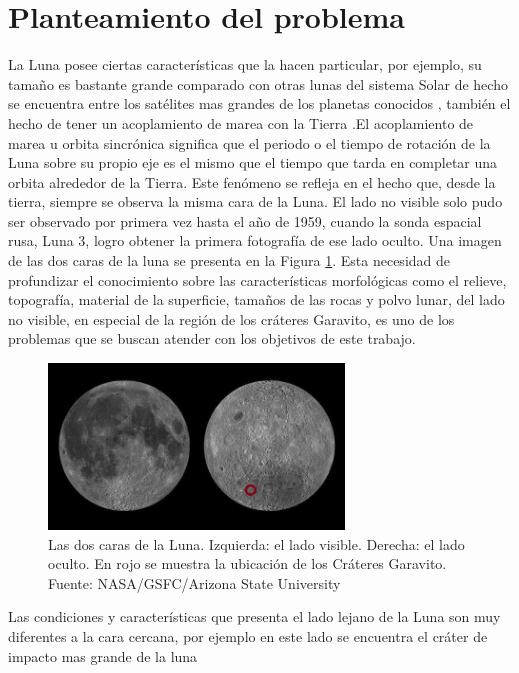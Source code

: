 \documentclass[12pt]{article}
\begin{document}
\newpage
\section{Planteamiento del problema}\label{sec:planteamiento}
La Luna posee ciertas características que la hacen particular, por ejemplo, su tamaño es bastante 
grande comparado con otras lunas del sistema Solar de hecho se encuentra entre los satélites mas grandes
de los planetas conocidos \parencite{CarrascoLicea2021}, también el hecho de tener un acoplamiento de 
marea con la Tierra \parencite{Razmi_2005}.El acoplamiento de marea u 
orbita sincrónica significa que el periodo o el tiempo de rotación de la Luna sobre su 
propio eje es el mismo que el tiempo que tarda en completar una orbita alrededor de la 
Tierra. Este fenómeno se refleja en el hecho que, desde la tierra, siempre se observa 
la misma cara de la Luna. El lado no visible solo pudo ser observado por primera vez hasta 
el año de 1959, cuando la sonda espacial rusa, Luna 3, logro obtener la primera fotografía 
de ese lado oculto. Una imagen de las dos caras de la luna se presenta en la Figura \ref{fig:caras_luna}.
Esta necesidad de profundizar el conocimiento sobre las características morfológicas como  el relieve, 
topografía, material de la superficie, tamaños de las rocas 
y polvo lunar, del lado no visible, en especial de la región de los cráteres Garavito, 
es uno de los problemas que se buscan atender con los objetivos de este trabajo.
\\
\begin{figure}[H]
    \includegraphics[width=0.7\textwidth]{images/Moon_sides.jpg}
    \centering
    \caption{Las dos caras de la Luna. Izquierda: el lado visible. Derecha: el lado 
    oculto. En rojo se muestra la ubicación de los Cráteres Garavito. 
    Fuente: NASA/GSFC/Arizona State University}
    \label{fig:caras_luna}
\end{figure}
Las condiciones y características que presenta el lado lejano de la Luna son muy diferentes 
a la cara cercana, por ejemplo en este lado se encuentra el cráter de impacto mas grande de la luna 
\end{document}
